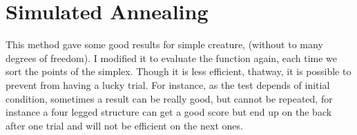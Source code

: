 \section{Simulated Annealing}
{

}


This method gave some good results for simple creature, (without to many degrees of freedom). I modified it to evaluate the function again, each time we sort the points of the simplex. Though it is less efficient, thatway, it is possible to prevent from having a lucky trial. For instance, as the test depends of initial condition, sometimes a result can be really good, but cannot be repeated, for instance a four legged structure can get a good score but end up on the back after one trial and will not be efficient on the next ones.

